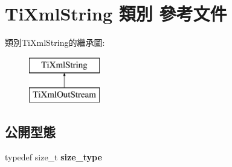 \hypertarget{class_ti_xml_string}{}\section{Ti\+Xml\+String 類別 參考文件}
\label{class_ti_xml_string}
類別\+Ti\+Xml\+String的繼承圖\+:\begin{figure}[H]
\begin{center}
\leavevmode
\includegraphics[height=2.000000cm]{class_ti_xml_string}
\end{center}
\end{figure}
\subsection*{公開型態}
\begin{DoxyCompactItemize}
\item 
typedef size\+\_\+t {\bfseries size\+\_\+type}\hypertarget{class_ti_xml_string_abeb2c1893a04c17904f7c06546d0b971}{}\label{class_ti_xml_string_abeb2c1893a04c17904f7c06546d0b971}

\end{DoxyCompactItemize}
